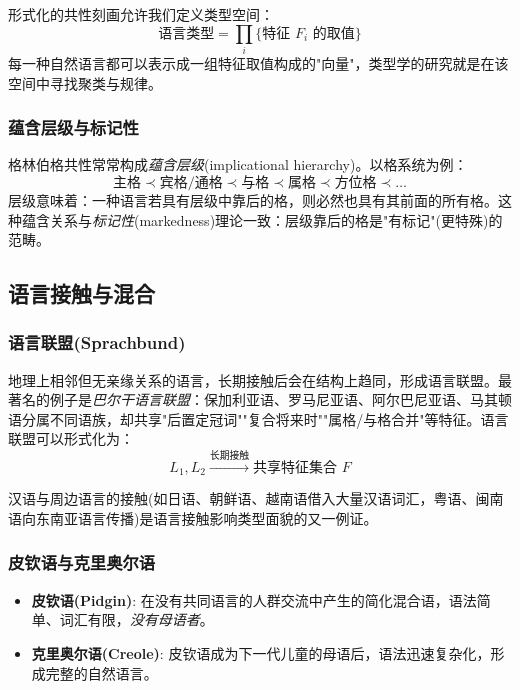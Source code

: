 形式化的共性刻画允许我们定义类型空间：
\begin{equation}
    \text{语言类型} = \prod_{i} \{\text{特征 } F_i \text{ 的取值}\}
\end{equation}
每一种自然语言都可以表示成一组特征取值构成的"向量"，类型学的研究就是在该空间中寻找聚类与规律。

\subsubsection{蕴含层级与标记性}

格林伯格共性常常构成\emph{蕴含层级}(implicational hierarchy)。以格系统为例：
\begin{equation}
    \text{主格} \prec \text{宾格/通格} \prec \text{与格} \prec \text{属格} \prec \text{方位格} \prec \ldots
\end{equation}
层级意味着：一种语言若具有层级中靠后的格，则必然也具有其前面的所有格。这种蕴含关系与\emph{标记性}(markedness)理论一致：层级靠后的格是"有标记"(更特殊)的范畴。

\subsection{语言接触与混合}

\subsubsection{语言联盟(Sprachbund)}

地理上相邻但无亲缘关系的语言，长期接触后会在结构上趋同，形成语言联盟。最著名的例子是\emph{巴尔干语言联盟}：保加利亚语、罗马尼亚语、阿尔巴尼亚语、马其顿语分属不同语族，却共享"后置定冠词""复合将来时""属格/与格合并"等特征。语言联盟可以形式化为：
\begin{equation}
    L_1, L_2 \xrightarrow{\text{长期接触}} \text{共享特征集合 } F
\end{equation}

汉语与周边语言的接触(如日语、朝鲜语、越南语借入大量汉语词汇，粤语、闽南语向东南亚语言传播)是语言接触影响类型面貌的又一例证。

\subsubsection{皮钦语与克里奥尔语}

\begin{itemize}
    \item \textbf{皮钦语(Pidgin)}: 在没有共同语言的人群交流中产生的简化混合语，语法简单、词汇有限，\emph{没有母语者}。
    \item \textbf{克里奥尔语(Creole)}: 皮钦语成为下一代儿童的母语后，语法迅速复杂化，形成完整的自然语言。
\end{itemize}

